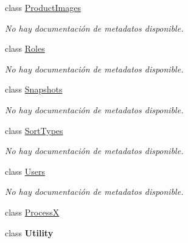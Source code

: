 \begin{DoxyCompactItemize}
class \hyperlink{class_microsoft_1_1_samples_1_1_kinect_1_1_basic_interactions_1_1_product_images}{Product\-Images}
\begin{DoxyCompactList}\small\item\em No hay documentación de metadatos disponible. \end{DoxyCompactList}\item 
class \hyperlink{class_microsoft_1_1_samples_1_1_kinect_1_1_basic_interactions_1_1_roles}{Roles}
\begin{DoxyCompactList}\small\item\em No hay documentación de metadatos disponible. \end{DoxyCompactList}\item 
class \hyperlink{class_microsoft_1_1_samples_1_1_kinect_1_1_basic_interactions_1_1_snapshots}{Snapshots}
\begin{DoxyCompactList}\small\item\em No hay documentación de metadatos disponible. \end{DoxyCompactList}\item 
class \hyperlink{class_microsoft_1_1_samples_1_1_kinect_1_1_basic_interactions_1_1_sort_types}{Sort\-Types}
\begin{DoxyCompactList}\small\item\em No hay documentación de metadatos disponible. \end{DoxyCompactList}\item 
class \hyperlink{class_microsoft_1_1_samples_1_1_kinect_1_1_basic_interactions_1_1_users}{Users}
\begin{DoxyCompactList}\small\item\em No hay documentación de metadatos disponible. \end{DoxyCompactList}\item 
class \hyperlink{class_microsoft_1_1_samples_1_1_kinect_1_1_basic_interactions_1_1_process_x}{Process\-X}
\item 
class {\bfseries Utility}
\end{DoxyCompactItemize}
